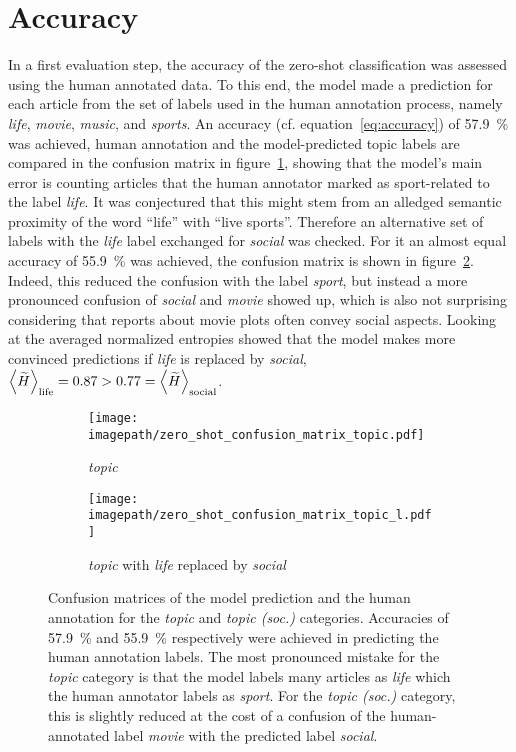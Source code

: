 \section{Accuracy}\label{ch:supervised_accuracy}
In a first evaluation step, the accuracy of the zero-shot classification was assessed using the human annotated data. To this end, the model made a prediction for each article from the set of labels used in the human annotation process, namely \textit{life}, \textit{movie}, \textit{music}, and \textit{sports}. An accuracy (cf. equation~\ref{eq:accuracy}) of \SI{57.9}{\percent} was achieved, human annotation and the model-predicted topic labels are compared in the confusion matrix in figure~\ref{fig:zero_shot_confusion_matrix_topic}, showing that the model's main error is counting articles that the human annotator marked as sport-related to the label \textit{life}. It was conjectured that this might stem from an alledged semantic proximity of the word ``life'' with ``live sports''. Therefore an alternative set of labels with the \textit{life} label exchanged for \textit{social} was checked. For it an almost equal accuracy of \SI{55.9}{\percent} was achieved, the confusion matrix is shown in figure~\ref{fig:zero_shot_confusion_matrix_topic_l}. Indeed, this reduced the confusion with the label \textit{sport}, but instead a more pronounced confusion of \textit{social} and \textit{movie} showed up, which is also not surprising considering that reports about movie plots often convey social aspects. Looking at the averaged normalized entropies showed that the model makes more convinced predictions if \textit{life} is replaced by \textit{social}, $\Braket{\widetilde{H}}_\text{life} = 0.87 > 0.77 = \Braket{\widetilde{H}}_\text{social}$.

\begin{figure}
    \centering
    \begin{subfigure}{0.48\textwidth}
        \centering
        \texttt{[image: \\imagepath/zero\_shot\_confusion\_matrix\_topic.pdf]}
        \caption{\textit{topic}}\label{fig:zero_shot_confusion_matrix_topic}
    \end{subfigure}
    \hspace{0.03\textwidth}
    \begin{subfigure}{0.48\textwidth}
        \centering
        \texttt{[image: \\imagepath/zero\_shot\_confusion\_matrix\_topic\_l.pdf]}
        \caption{\textit{topic} with \textit{life} replaced by \textit{social}}\label{fig:zero_shot_confusion_matrix_topic_l}
    \end{subfigure}
    \caption{Confusion matrices of the model prediction and the human annotation for the \textit{topic} and \textit{topic (soc.)} categories. Accuracies of \SI{57.9}{\percent} and \SI{55.9}{\percent} respectively were achieved in predicting the human annotation labels. The most pronounced mistake for the \textit{topic} category is that the model labels many articles as \textit{life} which the human annotator labels as \textit{sport}. For the \textit{topic (soc.)} category, this is slightly reduced at the cost of a confusion of the human-annotated label \textit{movie} with the predicted label \textit{social}.}\label{fig:zero_shot_confusion_matrices}
\end{figure}


